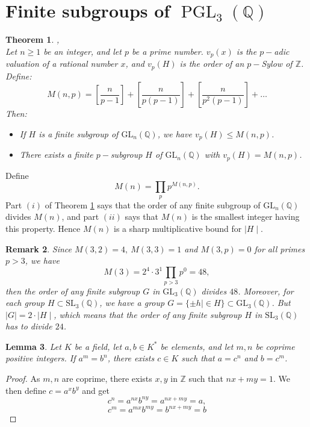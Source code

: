 \documentclass[leqno,12pt]{amsart} %
\newtheorem{thm}{Theorem}[section]
\newtheorem{lem}[thm]{Lemma}
\newtheorem{rmk}[thm]{Remark}
\newcommand{\Z}{\ensuremath{\mathbb{Z}}}
\newcommand{\Q}{\ensuremath{\mathbb{Q} }}
\DeclareMathOperator{\PGL}{PGL}
\begin{document}
 \section{\texorpdfstring{Finite subgroups of $\PGL_3(\Q)$}{Finite subgroups of PGL3}}
 \begin{thm}  \cite[Minkowski$^{\prime}$s theorem]{MR1580123}\label{thmm-05}, \cite[Theorem 1]{MR2336645}\\
Let $n\ge   1$ be an integer, and let $p$ be a prime number. $v_p(x)$ is the $p-$adic valuation of a rational number $x$, and $v_p(H)$ is the order of an $p-$Sylow of $\Z $. Define:
\[M(n,p)=[\frac{n}{p-1}]+[\frac{n}{p(p-1)}]+[\frac{n}{p^2(p-1)}]+\ldots \]
Then:
\begin{itemize}
    \item [(i)] If $H$ is a finite subgroup of $\mathrm{GL}_n(\Q )$, we have $v_p(H)\le  M(n,p)$.
    \item [(ii)] There exists a finite $p-$subgroup $H$ of $\mathrm{GL}_n(\Q )$ with $v_p(H) = M(n,p)$.
\end{itemize}
\end{thm}
Define \[M(n)=\prod_{p} p^{M(n,p)}.\]
Part $(i)$ of Theorem \ref{thmm-05} says that the order of any finite subgroup of $\mathrm{GL}_n(\Q )$ divides $M(n)$, and part $(ii)$ says that $M(n)$ is the smallest integer having this property. Hence $M(n)$ is a sharp multiplicative bound for $\mid H\mid $.\\
\begin{rmk}\label{remk-03}
    Since $M(3,2)=4,~M(3,3)=1$ and $M(3,p)=0$ for all primes $p>3$, we have 
    \[M(3)=2^4\cdot 3^1\prod_{p> 3} p^0=48,\] then the order of any finite subgroup $G$ in $\mathrm{GL}_3(\Q )$ divides $48$. Moreover, for each group $H\subset\mathrm{SL}_3(\Q )$, we have a group $G=\{\pm h\mid \in H\}\subset \mathrm{GL}_3(\Q )$. But $\mid G\mid =2\cdot\mid H\mid $, which means that the order of any finite subgroup $H$ in $\mathrm{SL}_3(\Q )$ has to divide $24$.
\end{rmk}
\begin{lem}\label{lemm-18}
    Let $K$ be a field, let $a,b \in K^*$ be elements, and let $m,n$ be coprime positive integers. If $a^m=b^n$, there exists $c \in K$ such that $a=c^n$ and $b=c^m$.
\end{lem}
\begin{proof}
    As $m,n$ are coprime, there exists $x,y$ in $\Z $ such that $nx+my=1$. We then define $c=a^xb^y$ and get
\[c^n=a^{nx}b^{ny}=a^{nx+my}=a,\]
\[c^m=a^{mx}b^{my}=b^{nx+my}=b\]
\end{proof}
\end{document}
